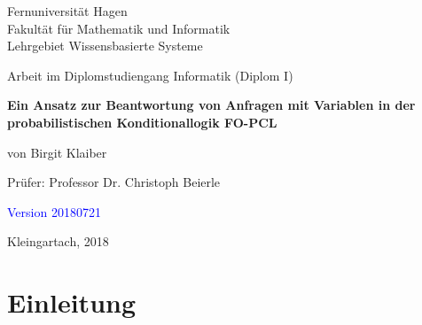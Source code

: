 \documentclass[a4paper, 11pt]{book}
\begin{document}
\begin{titlepage}
\thispagestyle{empty}
\begin{center}
\Large{Fernuniversität Hagen}\\
\Large{Fakultät für Mathematik und Informatik}\\
\Large{Lehrgebiet Wissensbasierte Systeme}\\[1.5cm]
\end{center}


\begin{center}
{Arbeit im Diplomstudiengang Informatik (Diplom I)}\\[2.0cm]
\end{center}

\begin{center}


\LARGE \textbf{Ein Ansatz zur Beantwortung von Anfragen mit Variablen in der probabilistischen Konditionallogik FO-PCL}\\[3.5cm]
\end{center}


\begin{center}
\large{von Birgit Klaiber}\\[3.5cm]
\end{center}

\begin{center}
\large{Prüfer: Professor Dr. Christoph Beierle }\\[1.0cm]
\end{center}

\begin{center}
\textcolor{blue}{Version 20180721}
	
\large{Kleingartach, 2018}
\end{center}

\end{titlepage}






\begingroup



\setcounter{tocdepth}{1}

\tableofcontents
\clearpage
\endgroup
{}
\pagestyle{plain}
\setcounter{page}{1}
\pagestyle{headings}


\setlength{\parskip}{5pt}




\chapter{Einleitung}
\end{document}
